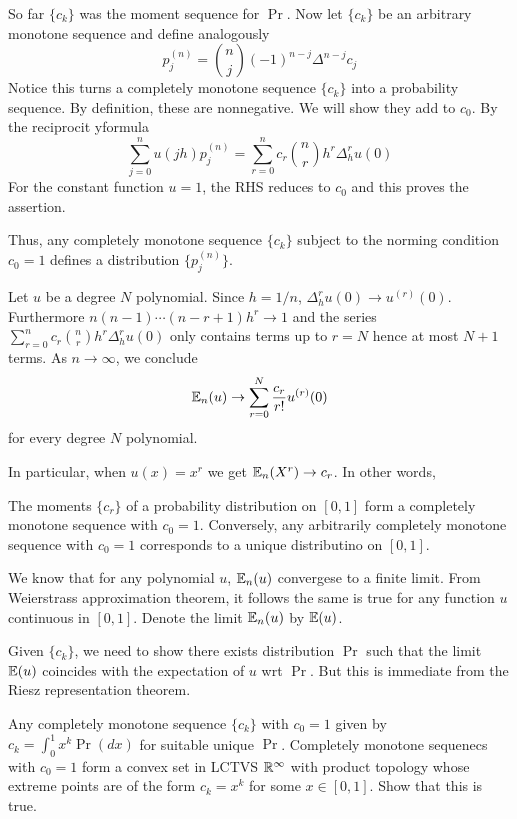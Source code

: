 So far $\{c_k\}$ was the moment sequence for $\Pr$. Now
let $\{c_k\}$ be an arbitrary monotone sequence and define analogously
\[
  p_j^{(n)} = \binom{n}{j} (-1)^{n-j} \Delta^{n-j} c_j
\]
Notice this turns a completely monotone sequence $\{c_k\}$
into a probability sequence.
By definition, these are nonnegative. We will show they add to $c_0$.
By the reciprocit yformula
\[
  \sum_{j=0}^n u(jh) p_j^{(n)}
  = \sum_{r=0}^n c_r \binom{n}{r} h^r \Delta_h^r u(0)
\]
For the constant function $u=1$, the RHS reduces to $c_0$ and this
proves the assertion.

Thus, any completely monotone sequence $\{c_k\}$ subject to
the norming condition $c_0 = 1$ defines
a distribution $\{p_j^{(n)}\}$.

Let $u$ be a degree $N$ polynomial.
Since $h = 1/n$, $\Delta_h^r u(0) \to u^{(r)}(0)$.
Furthermore $n(n-1)\cdots (n-r+1) h^r \to 1$ and the series
$\sum_{r=0}^n c_r \binom{n}{r} h^r \Delta_h^r u(0)$
only contains terms up to $r=N$ hence at most $N+1$ terms.
As $n \to \infty$, we conclude
\[
  \mathbb{E}_n(u) \to \sum_{r=0}^N \frac{c_r}{r!} u^{(r)}(0)
\]
for every degree $N$ polynomial.

In particular, when $u(x) = x^r$ we get $\mathbb{E}_n(X^r) \to c_r$.
In other words, \todo{}

\begin{theorem}[Hausdorff]
  The moments $\{c_r\}$ of a probability distribution on $[0,1]$
  form a completely monotone sequence with $c_0 = 1$.
  Conversely, any arbitrarily completely monotone sequence
  with $c_0 = 1$ corresponds to a unique distributino
  on $[0,1]$.
\end{theorem}

We know that for any polynomial $u$, $\mathbb{E}_n(u)$ convergese to a finite limit.
From Weierstrass approximation theorem, it follows the same is true for any
function $u$ continuous in $[0,1]$. Denote the limit $\mathbb{E}_n(u)$ by $\mathbb{E}(u)$.

Given $\{c_k\}$, we need to show there exists
distribution $\Pr$ such that the limit $\mathbb{E}(u)$
coincides with the expectation of $u$ wrt $\Pr$.
But this is immediate from the Riesz representation theorem.

Any completely monotone sequence $\{c_k\}$ with $c_0 = 1$
given by $c_k = \int_0^1 x^k \Pr(dx)$
for suitable unique $\Pr$.
Completely monotone sequenecs with $c_0 = 1$ form a convex
set in LCTVS $\mathbb{R}^\infty$ with product topology whose
extreme points are of the form $c_k = x^k$ for some $x \in [0,1]$.
Show that this is true.
